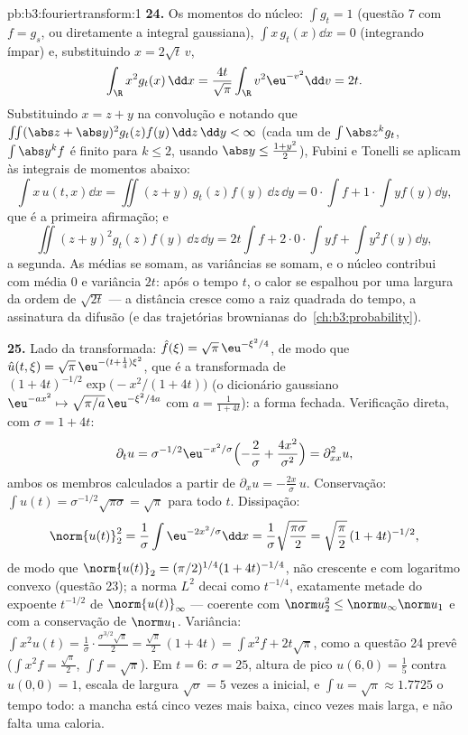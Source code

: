 \begin{solution}{pb:b3:fouriertransform:1}
\textbf{24.} Os momentos do núcleo: $\int g_t = 1$ (questão
7 com $f = g_s$, ou diretamente a integral gaussiana), $\int
x\,g_t(x)\dd x = 0$ (integrando ímpar) e, substituindo $x =
2\sqrt t\,v$,
\[
\int_\R x^2g_t(x)\,\dd x
= \frac{4t}{\sqrt\pi}\int_\R v^2\eu^{-v^2}\dd v = 2t .
\]
Substituindo $x = z + y$ na convolução e notando que
$\iint(\abs z + \abs y)^2g_t(z)f(y)\,\dd z\,\dd y < \infty$
(cada um de $\int\abs z^kg_t$, $\int\abs y^kf$ é finito para $k
\leq 2$, usando $\abs y \leq \frac{1 + y^2}2$), Fubini e
Tonelli se aplicam às integrais de momentos abaixo:
\[
\int x\,u(t,x)\dd x = \iint (z + y)\,g_t(z)f(y)\,\dd z\,\dd
y = 0\cdot\!\int\! f + 1\cdot\!\int\! yf(y)\dd y,
\]
que é a primeira afirmação; e
\[
\iint (z+y)^2g_t(z)f(y)\,\dd z\,\dd y
= 2t\int f + 2\cdot0\cdot\!\int\! yf + \int y^2f(y)\dd y ,
\]
a segunda. As médias se somam, as variâncias se somam, e o núcleo
contribui com média $0$ e variância $2t$: após o tempo $t$, o
calor se espalhou por uma largura da ordem de $\sqrt{2t}$ ---
a distância cresce como a raiz quadrada do tempo, a assinatura
da difusão (e das trajetórias brownianas do~\cref{ch:b3:probability}).

\textbf{25.} Lado da transformada: $\hat f(\xi) =
\sqrt\pi\,\eu^{-\xi^2/4}$, de modo que $\hat u(t,\xi) =
\sqrt\pi\,\eu^{-(t + \frac14)\xi^2}$, que é a transformada
de $(1 + 4t)^{-1/2}\exp\bigl(-x^2/(1+4t)\bigr)$ (o
dicionário gaussiano $\eu^{-ax^2} \mapsto
\sqrt{\pi/a}\,\eu^{-\xi^2/4a}$ com $a = \frac1{1+4t}$):
a forma fechada. Verificação direta, com $\sigma = 1 + 4t$:
\[
\partial_tu = \sigma^{-1/2}\eu^{-x^2/\sigma}
\Bigl(-\frac2\sigma + \frac{4x^2}{\sigma^2}\Bigr)
= \partial^2_{xx}u ,
\]
ambos os membros calculados a partir de $\partial_xu =
-\frac{2x}\sigma\,u$. Conservação: $\int u(t) =
\sigma^{-1/2}\sqrt{\pi\sigma} = \sqrt\pi$ para todo $t$.
Dissipação:
\[
\norm{u(t)}_2^2 = \frac1\sigma\int\eu^{-2x^2/\sigma}\dd x
= \frac1\sigma\sqrt{\frac{\pi\sigma}2}
= \sqrt{\frac\pi2}\,(1+4t)^{-1/2},
\]
de modo que $\norm{u(t)}_2 = (\pi/2)^{1/4}(1+4t)^{-1/4}$,
não crescente e com logaritmo convexo (questão 23); a
norma $L^2$ decai como $t^{-1/4}$, exatamente metade do
expoente $t^{-1/2}$ de $\norm{u(t)}_\infty$ --- coerente
com $\norm u_2^2 \leq \norm u_\infty\norm u_1$ e com a
conservação de $\norm u_1$. Variância: $\int x^2u(t) =
\frac1\sigma\cdot\frac{\sigma^{3/2}\sqrt\pi}2 =
\frac{\sqrt\pi}2\,(1 + 4t) = \int x^2f + 2t\sqrt\pi$, como
a questão 24 prevê ($\int x^2f = \frac{\sqrt\pi}2$, $\int
f = \sqrt\pi$). Em $t = 6$: $\sigma = 25$, altura de pico
$u(6, 0) = \frac15$ contra $u(0,0) = 1$, escala de largura
$\sqrt\sigma = 5$ vezes a inicial, e $\int u =
\sqrt\pi \approx 1.7725$ o tempo todo: a mancha está cinco vezes mais
baixa, cinco vezes mais larga, e não falta uma caloria.
\end{solution}
